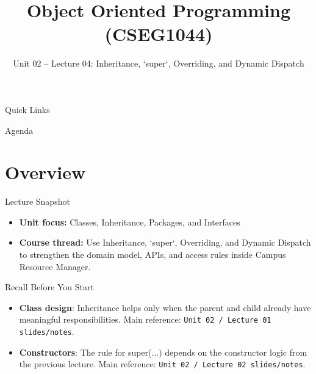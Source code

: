 \documentclass{beamer}
\title[OOPS with Java]{Object Oriented Programming (CSEG1044)}
\subtitle{Unit 02 -- Lecture 04: Inheritance, `super`, Overriding, and Dynamic Dispatch}
\begin{document}
\begin{frame}[fragile]
  \titlepage
  \vspace{0.5em}
  \slidesources{\OOPSUnitIISources}
\end{frame}

\begin{frame}{Quick Links}
  \centering
  \hyperlink{sec:overview}{}\hspace{0.6em}
  \hyperlink{sec:concepts}{}\hspace{0.6em}
  \hyperlink{sec:demo}{}\hspace{0.6em}
  \hyperlink{sec:summary}{}
  \slidesources{\OOPSUnitIISources}
\end{frame}

\begin{frame}{Agenda}
  \tableofcontents
  \slidesources{\OOPSUnitIISources}
\end{frame}

\section{Overview}
\label{sec:overview}

\begin{frame}{Lecture Snapshot}
\begin{itemize}[<+->]
  \item \textbf{Unit focus:} Classes, Inheritance, Packages, and Interfaces
  \item \textbf{Course thread:} Use Inheritance, `super`, Overriding, and Dynamic Dispatch to strengthen the domain model, APIs, and access rules inside Campus Resource Manager.
\end{itemize}
  \slidesources{\OOPSUnitIISources}
\end{frame}

\begin{frame}{Recall Before You Start}
\begin{itemize}[<+->]
  \item \textbf{Class design}: Inheritance helps only when the parent and child already have meaningful responsibilities. Main reference: \texttt{Unit 02 / Lecture 01 slides/notes}.
  \item \textbf{Constructors}: The rule for super(...) depends on the constructor logic from the previous lecture. Main reference: \texttt{Unit 02 / Lecture 02 slides/notes}.
\end{itemize}
  \slidesources{\OOPSUnitIISources}
\end{frame}
\end{document}
